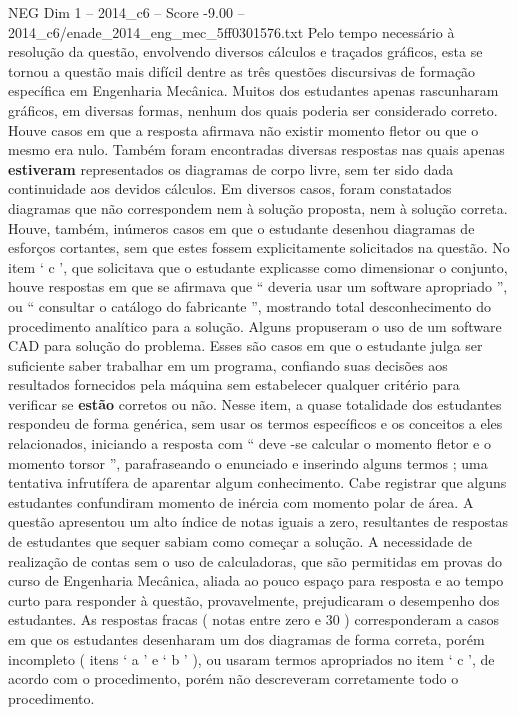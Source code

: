 \begin{textsample}{NEG Dim 1 – 2014\_c6 – Score -9.00 – 2014\_c6/enade\_2014\_eng\_mec\_5ff0301576.txt}
Pelo tempo necessário à resolução da questão, envolvendo diversos cálculos e traçados gráficos, esta se tornou a questão mais difícil dentre as três questões discursivas de formação específica em Engenharia Mecânica.
Muitos dos estudantes apenas rascunharam gráficos, em diversas formas, nenhum dos quais poderia ser considerado correto.
Houve casos em que a resposta afirmava não existir momento fletor ou que o mesmo era nulo.
Também foram encontradas diversas respostas nas quais apenas \textbf{estiveram} representados os diagramas de corpo livre, sem ter sido dada continuidade aos devidos cálculos.
Em diversos casos, foram constatados diagramas que não correspondem nem à solução proposta, nem à solução correta.
Houve, também, inúmeros casos em que o estudante desenhou diagramas de esforços cortantes, sem que estes fossem explicitamente solicitados na questão.
No item ‘ c ’, que solicitava que o estudante explicasse como dimensionar o conjunto, houve respostas em que se afirmava que “ deveria usar um software apropriado ”, ou “ consultar o catálogo do fabricante ”, mostrando total desconhecimento do procedimento analítico para a solução.
Alguns propuseram o uso de um software CAD para solução do problema.
Esses são casos em que o estudante julga ser suficiente saber trabalhar em um programa, confiando suas decisões aos resultados fornecidos pela máquina sem estabelecer qualquer critério para verificar se \textbf{estão} corretos ou não.
Nesse item, a quase totalidade dos estudantes respondeu de forma genérica, sem usar os termos específicos e os conceitos a eles relacionados, iniciando a resposta com “ deve -se calcular o momento fletor e o momento torsor ”, parafraseando o enunciado e inserindo alguns termos ; uma tentativa infrutífera de aparentar algum conhecimento.
Cabe registrar que alguns estudantes confundiram momento de inércia com momento polar de área.
A questão apresentou um alto índice de notas iguais a zero, resultantes de respostas de estudantes que sequer sabiam como começar a solução.
A necessidade de realização de contas sem o uso de calculadoras, que são permitidas em provas do curso de Engenharia Mecânica, aliada ao pouco espaço para resposta e ao tempo curto para responder à questão, provavelmente, prejudicaram o desempenho dos estudantes.
As respostas fracas ( notas entre zero e 30 ) corresponderam a casos em que os estudantes desenharam um dos diagramas de forma correta, porém incompleto ( itens ‘ a ’ e ‘ b ’ ), ou usaram termos apropriados no item ‘ c ’, de acordo com o procedimento, porém não descreveram corretamente todo o procedimento.

\end{textsample}
